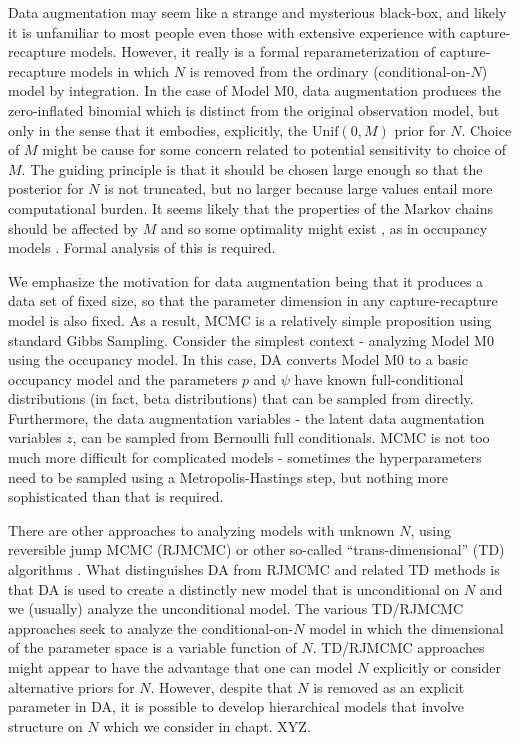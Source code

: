 Data augmentation may seem like a strange and mysterious black-box,
and likely it is unfamiliar to most people even those with extensive
experience with capture-recapture models. However, it really is a
formal reparameterization of capture-recapture models in which $N$ is
removed from the ordinary (conditional-on-$N$) model by integration.
In the case of Model M0, data augmentation produces the zero-inflated
binomial which is distinct from the original observation model, but
only in the sense that it embodies, explicitly, the $\mbox{Unif}(0,M)$
prior for $N$.  Choice of $M$ might be cause for some concern related
to potential sensitivity to choice of $M$. The guiding principle is
that it should be chosen large enough so that the posterior for $N$ is
not truncated, but no larger because large values entail more
computational burden. It seems likely that the properties of the
Markov chains should be affected by $M$ and so some optimality might
exist \citep{gopalaswamy_etal:2012}, as in occupancy models
\citep{mackenzie_royle:2005}. Formal analysis of this is required.


We emphasize the motivation for data augmentation being that it
produces a data set of fixed size, so that the parameter dimension in
any capture-recapture model is also fixed.  As a result, MCMC is a
relatively simple proposition using standard Gibbs Sampling.  Consider
the simplest context - analyzing Model M0 using the occupancy
model. In this case, DA converts Model M0 to a basic occupancy model
and the parameters $p$ and $\psi$ have known full-conditional
distributions (in fact, beta distributions) that can be sampled from
directly.  Furthermore, the data augmentation variables - the latent
data augmentation variables $z$, can be sampled from Bernoulli full
conditionals. MCMC is not too much more difficult for complicated
models - sometimes the hyperparameters need to be sampled using a
Metropolis-Hastings step, but nothing more sophisticated than that is
required.

There are other approaches to analyzing models with unknown $N$, using
reversible jump MCMC (RJMCMC) or other so-called ``trans-dimensional''
(TD) algorithms
 \citep{durban_elston:2005, king_brooks:2001, king_etal:2008,
schofield_barker:2008, wright_etal:2009}. What distinguishes DA from RJMCMC and
related TD methods is that DA is used to create a distinctly new model
that is unconditional on $N$ and we (usually) analyze the
unconditional model. The various TD/RJMCMC approaches seek to analyze
the conditional-on-$N$ model in which the dimensional of the parameter
space is a variable function of $N$. TD/RJMCMC approaches might appear
to have the advantage that one can model $N$ explicitly or consider
alternative priors for $N$. However, despite that $N$ is removed as an
explicit parameter in DA, it is possible to develop hierarchical
models that involve structure on $N$ \citep{converse_royle:2010,
  royle_etal:2011ms} which we consider in chapt.  XYZ.

